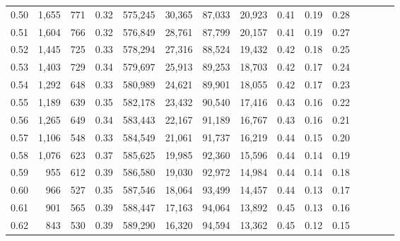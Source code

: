 \begin{tabular}{rrrcrrrrrrrrrrr}
0.50 &   1,655 &    771 &                                       0.32 &  575,245 &   30,365 &   87,033 &   20,923 &  0.41 &  0.19 &                         0.28 \\
0.51 &   1,604 &    766 &                                       0.32 &  576,849 &   28,761 &   87,799 &   20,157 &  0.41 &  0.19 &                         0.27 \\
0.52 &   1,445 &    725 &                                       0.33 &  578,294 &   27,316 &   88,524 &   19,432 &  0.42 &  0.18 &                         0.25 \\
0.53 &   1,403 &    729 &                                       0.34 &  579,697 &   25,913 &   89,253 &   18,703 &  0.42 &  0.17 &                         0.24 \\
0.54 &   1,292 &    648 &                                       0.33 &  580,989 &   24,621 &   89,901 &   18,055 &  0.42 &  0.17 &                         0.23 \\
0.55 &   1,189 &    639 &                                       0.35 &  582,178 &   23,432 &   90,540 &   17,416 &  0.43 &  0.16 &                         0.22 \\
0.56 &   1,265 &    649 &                                       0.34 &  583,443 &   22,167 &   91,189 &   16,767 &  0.43 &  0.16 &                         0.21 \\
0.57 &   1,106 &    548 &                                       0.33 &  584,549 &   21,061 &   91,737 &   16,219 &  0.44 &  0.15 &                         0.20 \\
0.58 &   1,076 &    623 &                                       0.37 &  585,625 &   19,985 &   92,360 &   15,596 &  0.44 &  0.14 &                         0.19 \\
0.59 &     955 &    612 &                                       0.39 &  586,580 &   19,030 &   92,972 &   14,984 &  0.44 &  0.14 &                         0.18 \\
0.60 &     966 &    527 &                                       0.35 &  587,546 &   18,064 &   93,499 &   14,457 &  0.44 &  0.13 &                         0.17 \\
0.61 &     901 &    565 &                                       0.39 &  588,447 &   17,163 &   94,064 &   13,892 &  0.45 &  0.13 &                         0.16 \\
0.62 &     843 &    530 &                                       0.39 &  589,290 &   16,320 &   94,594 &   13,362 &  0.45 &  0.12 &                         0.15 \\

\end{tabular}
